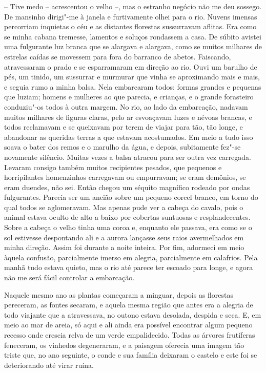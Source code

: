 -- Tive medo -- acrescentou o velho --, mas o estranho negócio não me
deu sossego. De mansinho dirigi"-me à janela e furtivamente olhei para o
rio. Nuvens imensas percorriam inquietas o céu e as distantes florestas
sussurravam aflitas. Era como se minha cabana tremesse, lamentos e
soluços rondassem a casa. De súbito avistei uma fulgurante luz branca
que se alargava e alargava, como se muitos milhares de estrelas caídas
se movessem para fora do barranco de abetos. Faiscando, atravessaram o
prado e se esparramaram em direção ao rio. Ouvi um barulho de pés, um
tinido, um sussurrar e murmurar que vinha se aproximando mais e mais, e
seguia rumo a minha balsa. Nela embarcaram todos: formas grandes e
pequenas que luziam; homens e mulheres ao que parecia, e crianças, e o
grande forasteiro conduziu"-os todos à outra margem. No rio, ao lado da
embarcação, nadavam muitos milhares de figuras claras, pelo ar
esvoaçavam luzes e névoas brancas, e todos reclamavam e se queixavam
por terem de viajar para tão, tão longe, e abandonar as queridas terras
a que estavam acostumados. Em meio a tudo isso soava o bater dos remos
e o marulho da água, e depois, subitamente fez"-se novamente silêncio.
Muitas vezes a balsa atracou para ser outra vez carregada. Levaram
consigo também muitos recipientes pesados, que pequenos e horripilantes
homenzinhos carregavam ou empurravam; se eram demônios, se eram
duendes, não sei. Então chegou um séquito magnífico rodeado por ondas
fulgurantes. Parecia ser um ancião sobre um pequeno corcel branco, em
torno do qual todos se aglomeravam. Mas apenas pude ver a cabeça do
cavalo, pois o animal estava oculto de alto a baixo por cobertas
suntuosas e resplandecentes. Sobre a cabeça o velho tinha uma coroa e,
enquanto ele passava, era como se o sol estivesse despontando ali e a
aurora lançasse seus raios avermelhados em minha direção. Assim foi
durante a noite inteira. Por fim, adormeci em meio àquela confusão,
parcialmente imerso em alegria, parcialmente em calafrios. Pela manhã
tudo estava quieto, mas o rio até parece ter escoado para longe, e
agora não me será fácil controlar a embarcação.

Naquele mesmo ano as plantas começaram a minguar, depois as florestas
pereceram, as fontes secaram, e aquela mesma região que antes era a
alegria de todo viajante que a atravessava, no outono estava desolada,
despida e seca. E, em meio ao mar de areia, só aqui e ali ainda era
possível encontrar algum pequeno recesso onde crescia relva de um verde
empalidecido. Todas as árvores frutíferas feneceram, os \mbox{vinhedos}
\mbox{degeneraram}, e a paisagem oferecia uma imagem tão triste que, no ano
seguinte, o conde e sua família deixaram o castelo e este foi se
deteriorando até virar ruína.

